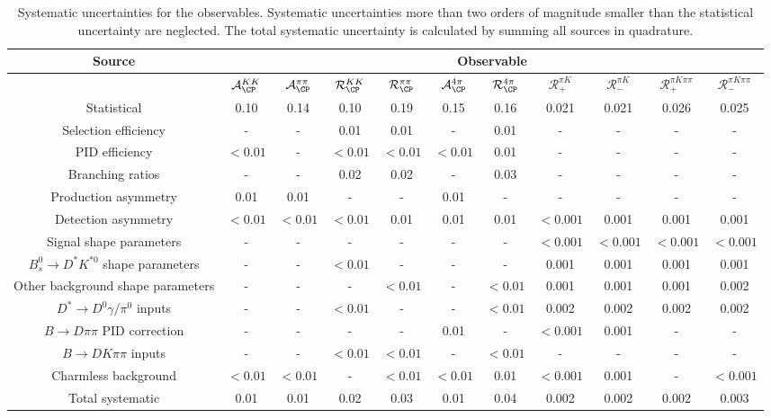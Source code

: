 \begin{sidewaystable}
  \centering
  \caption{Systematic uncertainties for the observables. Systematic uncertainties more than two orders of magnitude smaller than the statistical uncertainty are neglected. The total systematic uncertainty is calculated by summing all sources in quadrature.}
  \begin{tabular}{ccccccccccc}
      \toprule
      Source & \multicolumn{10}{c}{Observable} \\
      \midrule
       & $\mathcal{A}_{\CP}^{KK}$ & $\mathcal{A}_{\CP}^{\pi\pi}$ & $\mathcal{R}_{\CP}^{KK}$ & $\mathcal{R}_{\CP}^{\pi\pi}$ & $\mathcal{A}_{\CP}^{4\pi}$ & $\mathcal{R}_{\CP}^{4\pi}$ & $\mathcal{R}_+^{\pi K}$ & $\mathcal{R}_-^{\pi K}$ & $\mathcal{R}_+^{\pi K\pi\pi}$ & $\mathcal{R}_-^{\pi K\pi\pi}$ \\
      \midrule
      Statistical & 0.10 & 0.14 & 0.10 & 0.19 & 0.15 & 0.16 & 0.021 & 0.021 & 0.026 & 0.025 \\
      \midrule
      Selection efficiency & -  & -  & 0.01 & 0.01 & -  & 0.01 & -  & -  & -  & -  \\
      PID efficiency & $<0.01$ & -  & $<0.01$ & $<0.01$ & $<0.01$ & 0.01 & -  & -  & -  & -  \\
      Branching ratios & -  & -  & 0.02 & 0.02 & -  & 0.03 & -  & -  & -  & -  \\
      Production asymmetry & 0.01 & 0.01 & -  & -  & 0.01 & -  & -  & -  & -  & -  \\
      Detection asymmetry & $<0.01$ & $<0.01$ & $<0.01$ & 0.01 & 0.01 & 0.01 & $<0.001$ & 0.001 & 0.001 & 0.001 \\
      Signal shape parameters & -  & -  & -  & -  & -  & -  & $<0.001$ & $<0.001$ & $<0.001$ & $<0.001$ \\
      $B^0_s \to D^* K^{*0}$ shape parameters & -  & -  & $<0.01$ & -  & -  & -  & 0.001 & 0.001 & 0.001 & 0.001 \\
      Other background shape parameters & -  & -  & -  & $<0.01$ & -  & $<0.01$ & 0.001 & 0.001 & 0.001 & 0.002 \\
      $D^* \to D^0 \gamma/\pi^0$ inputs & -  & -  & $<0.01$ & -  & -  & $<0.01$ & 0.002 & 0.002 & 0.002 & 0.002 \\
      $B\to D\pi\pi$ PID correction & -  & -  & -  & -  & 0.01 & -  & $<0.001$ & 0.001 & -  & -  \\
      $B\to DK\pi\pi$ inputs & -  & -  & $<0.01$ & $<0.01$ & -  & $<0.01$ & -  & -  & -  & -  \\
      Charmless background & $<0.01$ & $<0.01$ & -  & $<0.01$ & $<0.01$ & 0.01 & $<0.001$ & 0.001 & -  & $<0.001$ \\
      \midrule
      Total systematic & 0.01 & 0.01 & 0.02 & 0.03 & 0.01 & 0.04 & 0.002 & 0.002 & 0.002 & 0.003 \\
      \bottomrule
  \end{tabular}
\label{tab:systematics}
\end{sidewaystable}

